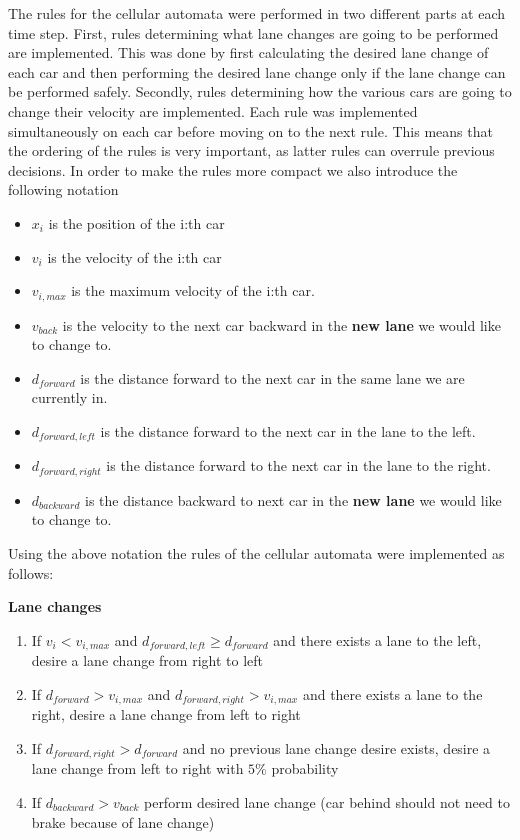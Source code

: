 \documentclass[a4paper,12pt]{article}
\begin{document}
The rules for the cellular automata were performed in two different parts at each time step.
First, rules determining what lane changes are going to be performed are implemented. This was done by first calculating the desired lane change of each car and then
performing the desired lane change only if the lane change can be performed safely.
Secondly, rules determining how the various cars are going to change their velocity are implemented.
Each rule was implemented simultaneously on each car before moving on to the next rule. This means that the ordering of the rules is very important, as latter rules can overrule previous decisions.
In order to make the rules more compact we also introduce the following notation

\begin{itemize}
    \item $x_i$ is the position of the i:th car
    \item $v_i$ is the velocity of the i:th car
    \item $v_{i, max}$ is the maximum velocity of the i:th car.
    \item $v_{back}$ is the velocity to the next car backward in the \textbf{new lane} we would like to change to.
    \item $d_{forward}$ is the distance forward to the next car in the same lane we are currently in.
    \item $d_{forward, left}$ is the distance forward to the next car in the lane to the left.
    \item $d_{forward, right}$ is the distance forward to the next car in the lane to the right.
    \item $d_{backward}$ is the distance backward to next car in the \textbf{new lane} we would like to change to.
\end{itemize}

Using the above notation the rules of the cellular automata were implemented as follows:

\vspace{5pt}
\textbf{Lane changes}
\begin{enumerate}
    \item If $v_i<v_{i,max}$ and $d_{forward, left}\geq d_{forward}$ and there exists a lane to the left, desire a lane change from right to left
    \item If $d_{forward} > v_{i, max}$ and $d_{forward, right} > v_{i, max}$ and there exists a lane to the right, desire a lane change from left to right
    \item If $d_{forward, right} > d_{forward}$ and no previous lane change desire exists, desire a lane change from left to right with $5\%$ probability
    \item If $d_{backward} > v_{back}$ perform desired lane change (car behind should not need to brake because of lane change)
\end{enumerate}
\end{document}
